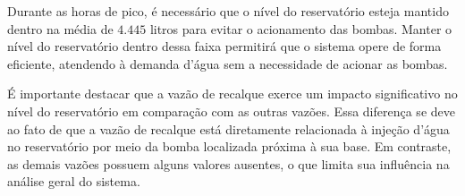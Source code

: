 Durante as horas de pico, é necessário que o nível do reservatório esteja mantido dentro na média de $4.445$ litros para evitar o acionamento das bombas. Manter o nível do reservatório dentro dessa faixa permitirá que o sistema opere de forma eficiente, atendendo à demanda d'água sem a necessidade de acionar as bombas.

É importante destacar que a vazão de recalque exerce um impacto significativo no nível do reservatório em comparação com as outras vazões. Essa diferença se deve ao fato de que a vazão de recalque está diretamente relacionada à injeção d'água no reservatório por meio da bomba localizada próxima à sua base. Em contraste, as demais vazões possuem alguns valores ausentes, o que limita sua influência na análise geral do sistema.
